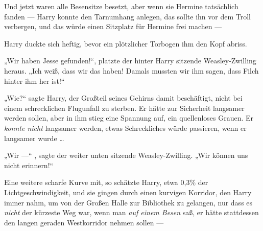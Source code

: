Und jetzt waren alle Besensitze besetzt, aber wenn sie Hermine tatsächlich fanden — Harry konnte den Tarnumhang anlegen, das sollte ihn vor dem Troll verbergen, und das würde einen Sitzplatz für Hermine frei machen —

Harry duckte sich heftig, bevor ein plötzlicher Torbogen ihm den Kopf abriss.

„Wir haben Jesse gefunden!“, platzte der hinter Harry sitzende Weasley-Zwilling heraus.
„Ich weiß, dass wir das haben! Damals mussten wir ihm sagen, dass Filch hinter ihm her ist!“

„Wie?“ sagte Harry, der Großteil seines Gehirns damit beschäftigt, nicht bei einem schrecklichen Flugunfall zu sterben. Er hätte zur Sicherheit langsamer werden sollen, aber in ihm stieg eine Spannung auf, ein quellenloses Grauen. Er \emph{konnte nicht} langsamer werden, etwas Schreckliches würde passieren, wenn er langsamer wurde …

„Wir —“ , sagte der weiter unten sitzende Weasley-Zwilling.
„Wir können uns nicht erinnern!“

Eine weitere scharfe Kurve mit, so schätzte Harry, etwa 0,3\% der Lichtgeschwindigkeit, und sie gingen durch einen kurvigen Korridor, den Harry immer nahm, um von der Großen Halle zur Bibliothek zu gelangen, nur dass es \emph{nicht} der kürzeste Weg war, wenn man \emph{auf einem Besen} saß, er hätte stattdessen den langen geraden Westkorridor nehmen sollen —

